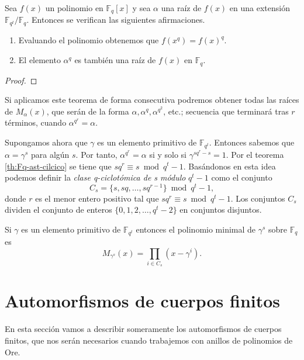 \begin{theorem}
  Sea \(f(x)\) un polinomio en \(\mathbb F_q[x]\) y sea \(\alpha\) una raíz de \(f(x)\) en una extensión \(\mathbb F_{q^t}/\mathbb F_q\).
  Entonces se verifican las siguientes afirmaciones.
  \begin{enumerate}
    \item Evaluando el polinomio obtenemos que \(f(x^q) = f(x)^q\).
    \item El elemento \(\alpha^q\) es también una raíz de \(f(x)\) en \(\mathbb F_q\).
  \end{enumerate}
\end{theorem}

\begin{proof}
\end{proof}

Si aplicamos este teorema de forma consecutiva podremos obtener todas las raíces de \(M_{\alpha}(x)\), que serán de la forma \(\alpha, \alpha^q, \alpha^{q^2},\)\,etc.; secuencia que terminará tras \(r\) términos, cuando \(\alpha^{q^r} = \alpha\).

Supongamos ahora que \(\gamma\) es un elemento primitivo de \(\mathbb F_{q^t}\).
Entonces sabemos que \(\alpha = \gamma^s\) para algún \(s\).
Por tanto, \(\alpha^{q^r} = \alpha\) si y solo si \(\gamma^{sq^r - s} = 1\).
Por el teorema \ref{th:Fq-ast-cilcico} se tiene que \(sq^r \equiv s \bmod q^t - 1\).
Basándonos en esta idea podemos definir la \textit{clase q-ciclotómica de s módulo} \(q^t - 1\) como el conjunto
\[
  C_s = \{s, sq, \dots, sq^{r-1}\} \bmod q^t - 1, 
\]
donde \(r\) es el menor entero positivo tal que \(sq^r \equiv s \bmod q^t - 1\).
Los conjuntos \(C_s\) dividen el conjunto de enteros \(\{0, 1, 2, \dots, q^t - 2\}\) en conjuntos disjuntos.


\begin{theorem}
  \label{th:pol-minimal-el-primitivo}
  Si \(\gamma\) es un elemento primitivo de \(\mathbb F_{q^t}\) entonces el polinomio minimal de \(\gamma^s\) sobre \(\mathbb F_q\) es
  \[
    M_{\gamma^s}(x) = \prod_{i \in C_s}(x - \gamma^i).
  \]
\end{theorem}

\section{Automorfismos de cuerpos finitos}

En esta sección vamos a describir someramente los automorfismos de cuerpos finitos, que nos serán necesarios cuando trabajemos con anillos de polinomios de Ore.

